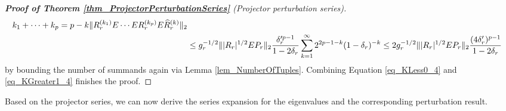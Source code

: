 \documentclass[a4paper,11pt]{article} %
\numberwithin{equation}{section}
\theoremstyle{definition}
\theoremstyle{remark}
\theoremstyle{plain}
\begin{document}
\begin{proof}[\normalfont \textbf{Proof of Theorem \ref{thm_ProjectorPerturbationSeries}} (Projector perturbation series)]
\begin{align}
{{                      k_{1} + \dots + k_{p} = p - k 
                    }
         } 
    \| R_{r}^{ ( k_{1} ) } E \cdots E R_{r}^{ ( k_{p} ) }
       E \widehat{R}_{r}^{ (k) } 
    \|_{2} 
    \\
    & \le 
    g_{r}^{-1/2} 
    \| | R_{r} |^{1/2} E P_{r} \|_{2} 
    \frac{ \delta_{r}'^{ p - 1 } }{ 1 - 2 \delta_{r} } 
    \sum_{ k = 1 }^{ \infty }
    2^{ 2 p - 1 - k } ( 1 - \delta_{r} )^{ - k } 
    \le 
    2g_{r}^{-1/2} 
    \| | R_{r} |^{1/2} E P_{r} \|_{2} 
    \frac{ ( 4 \delta_{r}' )^{ p - 1 } }{ 1 - 2 \delta_{r} } 
    \notag
  \end{align}
  by bounding the number of summands again via Lemma \ref{lem_NumberOfTuples}.
  Combining Equation \eqref{eq_KLess0_4} and \eqref{eq_KGreater1_4} finishes the
  proof. 
\end{proof}%

Based on the projector series, we can now derive the series expansion for the eigenvalues and the corresponding perturbation result.
\end{document}
